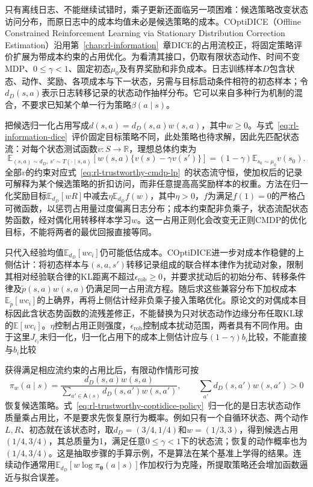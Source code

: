 只有离线日志、不能继续试错时，乘子更新还面临另一项困难：候选策略改变状态访问分布，而原日志中的成本均值未必是候选策略的成本。COptiDICE（Offline Constrained Reinforcement Learning via Stationary Distribution Correction Estimation）沿用第~\ref{chap:rl-information}~章DICE的占用流校正，将固定策略评价扩展为带成本约束的占用优化。为看清其接口，仍取有限状态动作、时间不变MDP、$0\leq\gamma<1$、固定初态$\mu_0$及有界奖励和非负成本。日志训练样本$D$包含状态、动作、奖励、各项成本与下一状态，另需与目标启动条件相符的初态样本；令$d_D(s,a)$表示日志转移记录的状态动作抽样分布。它可以来自多种行为机制的混合，不要求已知某个单一行为策略$\beta(a\mid s)$。

把候选归一化占用写成$d(s,a)=d_D(s,a)w(s,a)$，其中$w\geq0$。与式~\eqref{eq:rl-information-dice}~评价固定目标策略不同，此处策略也待求解，因此先匹配状态流：对每个状态测试函数$v:S\to\mathbb R$，理想总体约束为
\begin{equation}
 \mathbb E_{(s,a)\sim d_D,\,s'\sim T(\cdot\mid s,a)}
   \left[w(s,a)\{v(s)-\gamma v(s')\}\right]
   =(1-\gamma)\mathbb E_{s_0\sim\mu_0}v(s_0).
 \label{eq:rl-trustworthy-coptidice-flow}
\end{equation}
全部$v$的约束对应式~\eqref{eq:rl-trustworthy-cmdp-lp}~的状态流守恒，使加权后的记录可解释为某个候选策略的折扣访问，而非任意提高高奖励样本的权重。方法在归一化奖励目标$\mathbb E_{d_D}[wR]$中减去$\eta\mathbb E_{d_D}f(w)$，其中$\eta>0$，$f$为满足$f(1)=0$的严格凸可微函数，以惩罚占用量过度偏离日志分布；成本约束配非负乘子，状态流配状态势函数，经对偶化用转移样本学习$w$。这一占用正则化会改变无正则CMDP的优化目标，不能将两者的最优回报直接等同。

只代入经验均值$\mathbb E_{d_D}[wc_i]$仍可能低估成本。COptiDICE进一步对成本作稳健的上侧估计：将初态样本与$(s,a,s')$转移记录组成的联合样本律作为扰动对象，限制其相对经验联合律的KL距离不超过$\epsilon_{\mathrm{rob}}\geq0$，并要求扰动后的初始分布、转移条件律及$\widetilde p(s,a)w(s,a)$仍满足同一占用流方程。随后求这些兼容分布下加权成本$\mathbb E_{\widetilde p}[wc_i]$的上确界，再将上侧估计经非负乘子接入策略优化。原论文的对偶成本目标因此含状态势函数的流残差修正，不能替换为只对状态动作边缘分布任取KL球的$\mathbb E[wc_i]$。$\eta$控制占用正则强度，$\epsilon_{\mathrm{rob}}$控制成本扰动范围，两者具有不同作用。由于这里$J_{c_i}$未归一化，归一化占用下的成本上侧估计应与$(1-\gamma)b_i$比较，不能直接与$b_i$比较

获得满足相应流约束的占用比后，有限动作情形可按
\begin{equation}
 \pi_w(a\mid s)=
   \frac{d_D(s,a)w(s,a)}
        {\sum_{a'\in\mathsf A(s)}d_D(s,a')w(s,a')},
 \qquad \sum_{a'}d_D(s,a')w(s,a')>0
 \label{eq:rl-trustworthy-coptidice-policy}
\end{equation}
恢复候选策略。式~\eqref{eq:rl-trustworthy-coptidice-policy}~归一化的是日志状态动作质量乘占用比，不是要求先恢复原行为概率。例如只有一个自循环状态、两个动作$L,R$、初态就在该状态时，取$d_D=(3/4,1/4)$和$w=(1/3,3)$，得到候选占用$(1/4,3/4)$，其总质量为1，满足任意$0\leq\gamma<1$下的状态流；恢复的动作概率也为$(1/4,3/4)$。这是抽取步骤的手算示例，不是算法在某个基准上学得的结果。连续动作通常用$\mathbb E_{d_D}[w\log\pi_{\bm\theta}(a\mid s)]$作加权行为克隆，所提取策略还会增加函数逼近与拟合误差。

